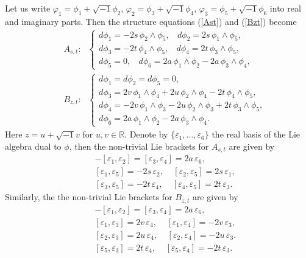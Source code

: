 \documentclass{amsart}
\numberwithin{equation}{section}
\theoremstyle{definition}
\renewcommand{\1}{\mathds{1}}
\renewcommand{\>}{\rightarrow}
\begin{document}
Let us write $\varphi_1=\phi_1+\sqrt{-1}\phi_2$,  $\varphi_2=\phi_3+\sqrt{-1}\phi_4$, $\varphi_3=\phi_5+\sqrt{-1}\phi_6$ into real and imaginary parts. Then the structure equations (\ref{Ast}) and (\ref{Bzt}) become
\begin{eqnarray}
&& A_{s,t}: \ \ \ \left\{ \begin{array}{lll} d\phi_1 = -2s \,\phi_2\wedge \phi_5, \ \ \ \ d\phi_2 = 2s \,\phi_1\wedge \phi_5, \\
d\phi_3 = -2t \,\phi_4\wedge \phi_5, \ \ \ \ d\phi_4 = 2t \,\phi_3\wedge \phi_5, \\
d\phi_5 = 0, \ \ \ \ d\phi_6 = 2a \,\phi_1\wedge \phi_2 - 2a\, \phi_3\wedge \phi_4,  \end{array} \right.  \label{Ast2} \\
&&
B_{z,t}: \ \ \ \left\{ \begin{array}{llll} d\phi_1 = d\phi_2 =  d\phi_5 = 0, \\
 d\phi_3 = 2v\, \phi_1\wedge \phi_4 + 2u \,\phi_2\wedge \phi_4 -  2t \,\phi_4\wedge \phi_5, \\
 d\phi_4 = -2v\, \phi_1\wedge \phi_3 - 2u \,\phi_2\wedge \phi_3 + 2t \,\phi_3\wedge \phi_5, \\
d\phi_6 = 2a \,\phi_1\wedge \phi_2 - 2a\, \phi_3\wedge \phi_4.  \end{array} \right.  \label{Bzt2}
\end{eqnarray}
Here $z=u+\sqrt{-1}v$ for $u,v \in \mathbb{R}$.
Denote by $\{ \varepsilon_1, \ldots ,  \varepsilon_6\}$ the real basis of the Lie algebra dual to $\phi$, then the non-trivial Lie brackets for $A_{s,t}$ are given by
\begin{eqnarray}
&&  -[\varepsilon_1, \varepsilon_2] = [\varepsilon_3, \varepsilon_4] = 2a\, \varepsilon_6,  \nonumber \\
&& [\varepsilon_1, \varepsilon_5] = -2s\, \varepsilon_2 , \ \ \ \ \ [\varepsilon_2, \varepsilon_5] = 2s\, \varepsilon_1, \\
&& [\varepsilon_3, \varepsilon_5] = -2t\, \varepsilon_4 , \ \ \ \ \ [\varepsilon_4, \varepsilon_5] = 2t\, \varepsilon_3. \nonumber
\end{eqnarray}
Similarly, the the non-trivial Lie brackets for $B_{z,t}$ are given by %
\begin{eqnarray}
&&  -[\varepsilon_1, \varepsilon_2] = [\varepsilon_3, \varepsilon_4] = 2a\, \varepsilon_6,  \nonumber \\
&& [\varepsilon_1, \varepsilon_3] = 2v\, \varepsilon_4 , \ \ \ \ \ [\varepsilon_1, \varepsilon_4] = -2v\, \varepsilon_3, \\
&& [\varepsilon_2, \varepsilon_3] = 2u\, \varepsilon_4 , \ \ \ \ \ [\varepsilon_2, \varepsilon_4] = -2u\, \varepsilon_3. \nonumber \\
&& [\varepsilon_5, \varepsilon_3] = 2t\, \varepsilon_4 , \ \ \ \ \ [\varepsilon_5, \varepsilon_4] = -2t\, \varepsilon_3. \nonumber
\end{eqnarray}
\end{document}
